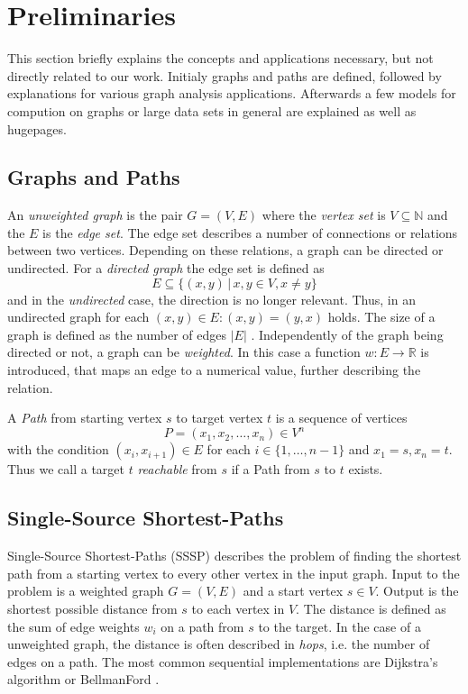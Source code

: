 
\section{Preliminaries}
This section briefly explains the concepts and applications necessary, but not directly related to our work.
Initialy graphs and paths are defined, followed by explanations for various graph analysis applications.
Afterwards a few models for compution on graphs or large data sets in general are explained as well as hugepages.

\subsection{Graphs and Paths}
An \emph{unweighted graph} is the pair $G=(V,E)$ where the \emph{vertex set} is $V\subseteq\mathbb N$ and the $E$ is the \emph{edge set}.
The edge set describes a number of connections or relations between two vertices. Depending on these relations, a graph can be directed or undirected. For a \emph{directed graph} the edge set is defined as
\begin{equation*}
  E\subseteq\{(x,y)\,|\, x,y\in V, x\neq y\}
\end{equation*}
and in the \emph{undirected} case, the direction is no longer relevant. Thus, in an undirected graph for each $(x,y)\in E: (x,y)=(y,x)$ holds.
The size of a graph is defined as the number of edges $|E|$ \cite{newman2010networks}.
Independently of the graph being directed or not, a graph can be \emph{weighted}. In this case a function $w:E\rightarrow \mathbb R$ is introduced, that maps an edge to a numerical value, further describing the relation.

A \emph{Path} from starting vertex $s$ to target vertex $t$ is a sequence of vertices
\begin{equation*}
	P=(x_1,x_2,\ldots,x_n)\in V^n
\end{equation*}
with the condition $(x_i,x_{i+1})\in E$ for each $i\in\{1,\ldots,n-1\}$ and $x_1=s, x_n=t$.
Thus we call a target $t$ \emph{reachable} from $s$ if a Path from $s$ to $t$ exists.

\subsection{Single-Source Shortest-Paths}
Single-Source Shortest-Paths (SSSP) describes the problem of finding the shortest path from a starting vertex to every other vertex in the input graph.
Input to the problem is a weighted graph $G=(V,E)$ and a start vertex $s\in V$. Output is the shortest possible distance from $s$ to each vertex in $V$.
The distance is defined as the sum of edge weights $w_i$ on a path from $s$ to the target.
In the case of a unweighted graph, the distance is often described in \emph{hops}, i.e. the number of edges on a path.
The most common sequential implementations are Dijkstra's algorithm or BellmanFord \cite{Polymer, Ligra, pregel}.

